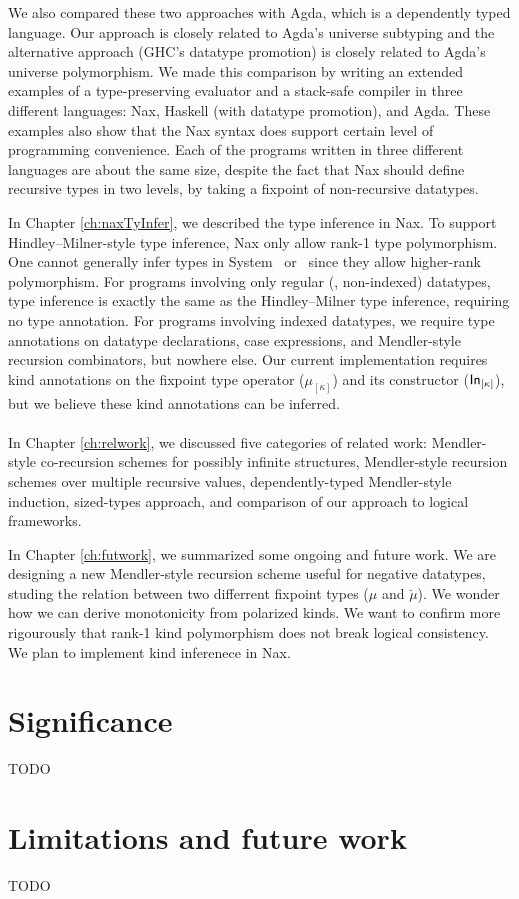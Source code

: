 We also compared these two approaches with Agda, which
is a dependently typed language. Our approach is closely related to
Agda's universe subtyping and the alternative approach
(GHC's datatype promotion) is closely related to
Agda's universe polymorphism. We made this comparison by writing an extended
examples of a type-preserving evaluator and a stack-safe compiler
in three different languages: Nax, Haskell (with datatype promotion), and Agda.
These examples also show that the Nax syntax does support certain level of
programming convenience. Each of the programs written in three different
languages are about the same size, despite the fact that Nax should define
recursive types in two levels, by taking a fixpoint of non-recursive datatypes.

In Chapter \ref{ch:naxTyInfer}, we described the type inference in Nax.
To support Hindley--Milner-style type inference, Nax only
allow rank-1 type polymorphism. One cannot generally infer types
in System \Fi\ or \Fixi\ since they allow higher-rank polymorphism.
For programs involving only regular (\ie, non-indexed) datatypes,
type inference is exactly the same as the Hindley--Milner type inference,
requiring no type annotation. For programs involving indexed datatypes,
we require type annotations on datatype declarations, case expressions, and
Mendler-style recursion combinators, but nowhere else.
Our current implementation requires kind annotations on
the fixpoint type operator ($\mu_{[\kappa]}$) and its constructor
($\mathsf{In}_{[\kappa]}$), but we believe these kind annotations can be inferred.

\paragraph{}
In Chapter \ref{ch:relwork}, we discussed five categories of related work:
Mendler-style co-recursion schemes for possibly infinite structures,
Mendler-style recursion schemes over multiple recursive values,
dependently-typed Mendler-style induction, sized-types approach,
and comparison of our approach to logical frameworks.

In Chapter \ref{ch:futwork}, we summarized some ongoing and future work.
We are designing a new Mendler-style recursion scheme useful
for negative datatypes, studing the relation between two differrent
fixpoint types ($\mu$ and $\breve\mu$). We wonder how we can derive
monotonicity from polarized kinds. We want to confirm more rigourously
that rank-1 kind polymorphism does not break logical consistency.
We plan to implement kind inferenece in Nax.

\section{Significance}\label{sec:concl:sig}
TODO

\section{Limitations and future work}\label{sec:concl:fw}
TODO

